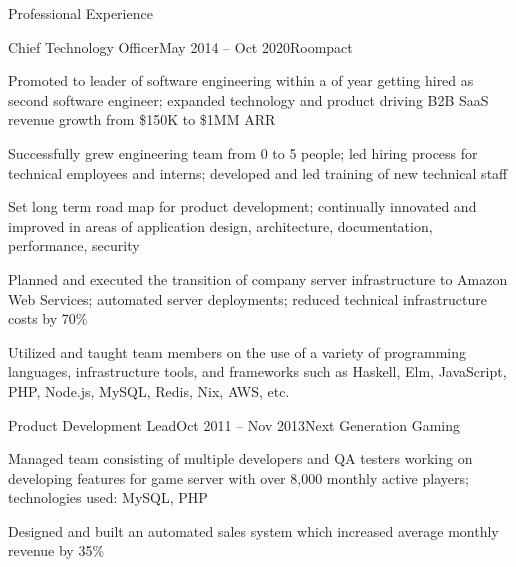 \documentclass{resume} %
\begin{document}
\begin{rSection}{Professional Experience}
\begin{rSubsection}{Chief Technology Officer}{May 2014 -- Oct 2020}{Roompact}{}
  \item Promoted to leader of software engineering within a of year getting hired as second software engineer; expanded technology and product driving B2B SaaS revenue growth from \$150K to \$1MM ARR
  \item Successfully grew engineering team from 0 to 5 people; led hiring process for technical employees and interns; developed and led training of new technical staff
  \item Set long term road map for product development; continually innovated and improved in areas of application design, architecture, documentation, performance, security
  \item Planned and executed the transition of company server infrastructure to Amazon Web Services; automated server deployments; reduced technical infrastructure costs by 70\%
  \item Utilized and taught team members on the use of a variety of programming languages, infrastructure tools, and frameworks such as Haskell, Elm, JavaScript, PHP, Node.js, MySQL, Redis, Nix, AWS, etc.
\end{rSubsection}


\begin{rSubsection}{Product Development Lead}{Oct 2011 -- Nov 2013}{Next Generation Gaming}{}
  \item Managed team consisting of multiple developers and QA testers working on developing features for game server with over 8,000 monthly active players; technologies used: MySQL, PHP
  \item Designed and built an automated sales system which increased average monthly revenue by 35\%
\end{rSubsection}

\end{rSection}

\end{document}
